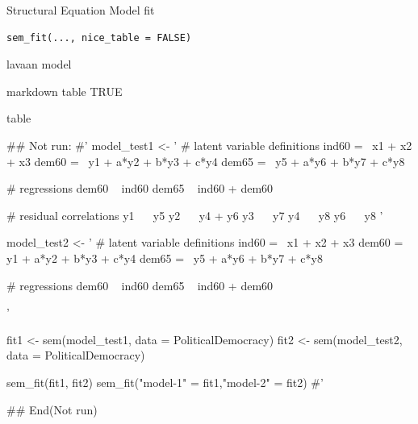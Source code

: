 \documentclass[a4paper]{book}
\begin{document}
%
\begin{Description}
Structural Equation Model fit
\end{Description}
%
\begin{Usage}
\begin{verbatim}
sem_fit(..., nice_table = FALSE)
\end{verbatim}
\end{Usage}
%
\begin{Arguments}
\begin{ldescription}
\item[\code{...}] lavaan model

\item[\code{nice\_table}] markdown table TRUE
\end{ldescription}
\end{Arguments}
%
\begin{Value}
table
\end{Value}
%
\begin{Examples}
\begin{ExampleCode}
\#\# Not run: 
#'
model_test1 <- '
  # latent variable definitions
     ind60 =~ x1 + x2 + x3
     dem60 =~ y1 + a*y2 + b*y3 + c*y4
     dem65 =~ y5 + a*y6 + b*y7 + c*y8

  # regressions
    dem60 ~ ind60
    dem65 ~ ind60 + dem60

  # residual correlations
    y1 ~~ y5
    y2 ~~ y4 + y6
    y3 ~~ y7
    y4 ~~ y8
    y6 ~~ y8
'

model_test2 <- '
  # latent variable definitions
     ind60 =~ x1 + x2 + x3
     dem60 =~ y1 + a*y2 + b*y3 + c*y4
     dem65 =~ y5 + a*y6 + b*y7 + c*y8

  # regressions
    dem60 ~ ind60
    dem65 ~ ind60 + dem60

'

fit1 <- sem(model_test1, data = PoliticalDemocracy)
fit2 <- sem(model_test2, data = PoliticalDemocracy)

sem_fit(fit1, fit2)
sem_fit("model-1" = fit1,"model-2" = fit2)
#'

## End(Not run)
\end{ExampleCode}
\end{Examples}
\end{document}
